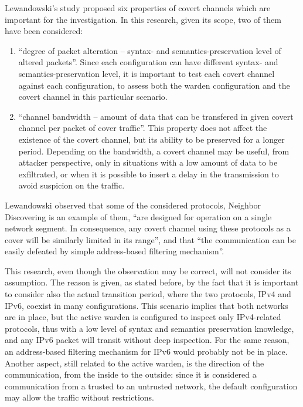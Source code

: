 \documentclass[12pt]{article}
\begin{document}
Lewandowski's study proposed six properties of covert channels which are important for the investigation. In this research, given its scope, two of them have been considered:
\vspace{-15pt}
\begin{enumerate}[noitemsep,topsep=0pt,partopsep=0pt]
 \item ``degree of packet alteration – syntax- and semantics-preservation level of altered packets''. Since each configuration can have different syntax- and semantics-preservation level, it is important to test each covert channel against each configuration, to assess both the warden configuration and the covert channel in this particular scenario\cite{lewandowski}.
 \item ``channel bandwidth – amount of data that can be transfered in given covert channel per packet of cover traffic''. This property does not affect the existence of the covert channel, but its ability to be preserved for a longer period. Depending on the bandwidth, a covert channel may be useful, from attacker perspective, only in situations with a low amount of data to be exfiltrated, or when it is possible to insert a delay in the transmission to avoid suspicion on the traffic\cite{lewandowski}.
\end{enumerate}

Lewandowski observed that some of the considered protocols, Neighbor Discovering is an example of them, ``are designed for operation on a single network segment. In consequence, any covert channel using these protocols as a cover will be similarly limited in its range'', and that ``the communication can be easily defeated by simple address-based filtering mechanism''\cite{lewandowski}.

This research, even though the observation may be correct, will not consider its assumption. The reason is given, as stated before, by the fact that it is important to consider also the actual transition period, where the two protocols, IPv4 and IPv6, coexist in many configurations. This scenario implies that both networks are in place, but the active warden is configured to inspect only IPv4-related protocols, thus with a low level of syntax and semantics preservation knowledge, and any IPv6 packet will transit without deep inspection. For the same reason, an address-based filtering mechanism for IPv6 would probably not be in place. Another aspect, still related to the active warden, is the direction of the communication, from the inside to the outside: since it is considered a communication from a trusted to an untrusted network, the default configuration may allow the traffic without restrictions.
\end{document}
